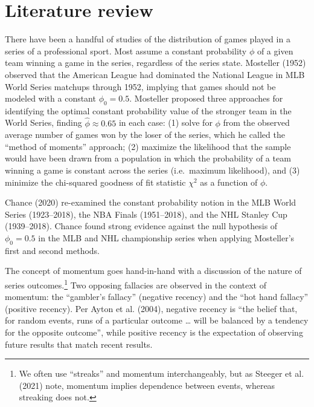 \documentclass{article}
\begin{document}
\hypertarget{literature-review}{%
\section{Literature review}\label{literature-review}}

There have been a handful of studies of the distribution of games played
in a series of a professional sport. Most assume a constant probability
\(\phi\) of a given team winning a game in the series, regardless of the
series state. Mosteller (1952) observed that the American League had
dominated the National League in MLB World Series matchups through 1952,
implying that games should not be modeled with a constant
\(\phi_0 = 0.5\). Mosteller proposed three approaches for identifying
the optimal constant probability value of the stronger team in the World
Series, finding \(\hat{\phi} \approx 0.65\) in each case: (1) solve for
\(\phi\) from the observed average number of games won by the loser of
the series, which he called the ``method of moments'' approach; (2)
maximize the likelihood that the sample would have been drawn from a
population in which the probability of a team winning a game is constant
across the series (i.e.~maximum likelihood), and (3) minimize the
chi-squared goodness of fit statistic \(\chi^2\) as a function of
\(\phi\).

Chance (2020) re-examined the constant probability notion in the MLB
World Series (1923--2018), the NBA Finals (1951--2018), and the NHL
Stanley Cup (1939--2018). Chance found strong evidence against the null
hypothesis of \(\phi_0 = 0.5\) in the MLB and NHL championship series
when applying Mosteller's first and second methods.

The concept of momentum goes hand-in-hand with a discussion of the
nature of series outcomes.\footnote{We often use ``streaks'' and
  momentum interchangeably, but as Steeger et al. (2021) note, momentum
  implies dependence between events, whereas streaking does not.} Two
opposing fallacies are observed in the context of momentum: the
``gambler's fallacy'' (negative recency) and the ``hot hand fallacy''
(positive recency). Per Ayton et al. (2004), negative recency is ``the
belief that, for random events, runs of a particular outcome \ldots{}
will be balanced by a tendency for the opposite outcome'', while
positive recency is the expectation of observing future results that
match recent results.
\end{document}
